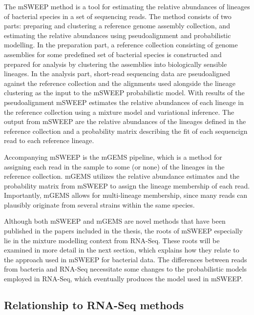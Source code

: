 \documentclass[officiallayout]{tktla}
\begin{document}
The mSWEEP method is a tool for estimating the relative abundances of
lineages of bacterial species in a set of sequencing reads. The method
consists of two parts: preparing and clustering a reference genome
assembly collection, and estimating the relative abundances using
pseudoalignment \citep{bray2016near} and probabilistic modelling. In
the preparation part, a reference collection consisting of genome
assemblies for some predefined set of bacterial species is constructed
and prepared for analysis by clustering the assemblies into
biologically sensible lineages. In the analysis part, short-read
sequencing data are pseudoaligned against the reference collection and
the alignments used alongside the lineage clustering as the input to
the mSWEEP probabilistic model. With results of the pseudoalignment
mSWEEP estimates the relative abundances of each lineage in the
reference collection using a mixture model and variational
inference. The output from mSWEEP are the relative abundances of the
lineages defined in the reference collection and a probability matrix
describing the fit of each sequencign read to each reference lineage.

Accompanying mSWEEP is the mGEMS pipeline, which is a method for
assigning each read in the sample to some (or none) of the lineages in
the reference collection. mGEMS utilizes the relative abundance
estimates and the probability matrix from mSWEEP to assign the
lineage membership of each read. Importantly, mGEMS allows for
multi-lineage membership, since many reads can plausibly originate
from several strains within the same species.

Although both mSWEEP and mGEMS are novel methods that have been
published in the papers included in the thesis, the roots of mSWEEP
especially lie in the mixture modelling context from RNA-Seq. These
roots will be examined in more detail in the next section, which
explains how they relate to the approach used in mSWEEP for bacterial
data. The differences between reads from bacteria and RNA-Seq
necessitate some changes to the probabilistic models employed in
RNA-Seq, which eventually produces the model used in mSWEEP.

\subsection{Relationship to RNA-Seq methods}
\end{document}

